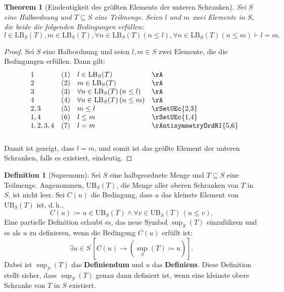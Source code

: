 \documentclass{book}
\theoremstyle{plain}
\newtheorem{theorem}{Theorem}
\theoremstyle{remark}
\theoremstyle{definition}
\newtheorem{definition}{Definition}[section]
\begin{document}
\label{lInLBwmInLBwFanInLBLpnLeqlRpwFanInLBLpnLeqmRpImplEqualsm}
\begin{theorem}[Eindeutigkeit des größten Elements der unteren Schranken]
    Sei \( S \) eine Halbordnung und \( T \subseteq S \) eine Teilmenge. Seien \( l \) und \( m \) zwei Elemente in \( S \), die beide die folgenden Bedingungen erfüllen:
    \[
    l \in \text{LB}_S(T), m \in \text{LB}_S(T), \forall n \in \text{LB}_S(T) (n \leq l), \forall n \in \text{LB}_S(T) (n \leq m) \vdash l = m.
    \]
\end{theorem}

\begin{proof}
    Sei \( S \) eine Halbordnung und seien \( l, m \in S \) zwei Elemente, die die Bedingungen erfüllen. Dann gilt:
    \[
    \begin{array}{lll p{4cm}}
        1 & (1) & l \in \text{LB}_S(T) & \rA \\
        2 & (2) & m \in \text{LB}_S(T) & \rA \\
        3 & (3) & \forall n \in \text{LB}_S(T) \, (n \leq l) & \rA \\
        4 & (4) & \forall n \in \text{LB}_S(T) \, (n \leq m) & \rA \\
        2,3 & (5) & m \leq l & \rSetUEc{2,3}  \\
        1,4 & (6) & l \leq m & \rSetUEc{1,4} \\
        1,2,3,4 & (7) & l = m & \rAntisymmetryOrdRI{5,6} \\
    \end{array}
    \]
    Damit ist gezeigt, dass \( l = m \), und somit ist das größte Element der unteren Schranken, falls es existiert, eindeutig.
\end{proof}


\begin{definition}[Supremum]
    Sei \( S \) eine halbgeordnete Menge und \( T \subseteq S \) eine Teilmenge. Angenommen, \(\text{UB}_S(T)\), die Menge aller oberen Schranken von \( T \) in \( S \), ist nicht leer. Sei \( C(u) \) die Bedingung, dass \( u \) das kleinste Element von \(\text{UB}_S(T)\) ist, d.\,h.,
    \[
    C(u) := u \in \text{UB}_S(T) \land \forall v \in \text{UB}_S(T) \, (u \leq v).
    \]
    Eine partielle Definition erlaubt es, das neue Symbol \(\sup_S(T)\) einzuführen und es als \( u \) zu definieren, wenn die Bedingung \( C(u) \) erfüllt ist:
    \[
    \exists u \in S \, [ C(u) \rightarrow (\sup_S(T) \coloneqq u) ].
    \]
    Dabei ist \(\sup_S(T)\) das \textbf{Definiendum} und \( u \) das \textbf{Definiens}. Diese Definition stellt sicher, dass \(\sup_S(T)\) genau dann definiert ist, wenn eine kleinste obere Schranke von \( T \) in \( S \) existiert.
\end{definition}
\end{document}
